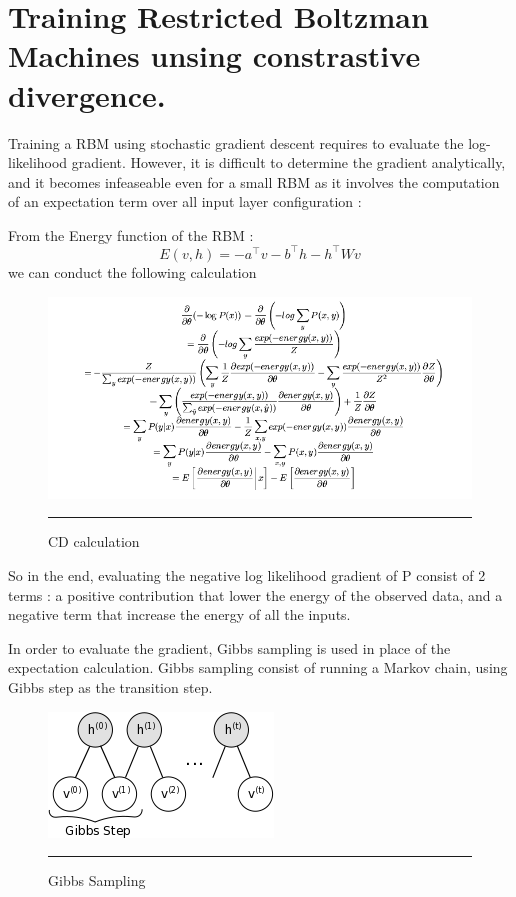 \section{Training Restricted Boltzman Machines unsing constrastive divergence.}


    Training a RBM using stochastic gradient descent requires to evaluate the log-likelihood gradient. However, it is difficult to determine the gradient analytically, and it becomes infeaseable even for a small RBM as it involves the computation of an expectation term over all input layer configuration :

From the Energy function of the RBM :
$$ E(v, h) = -a ^\top v - b^\top h - h^\top W v$$
we can conduct the following calculation 

\begin{figure}[htbp]
    \centering
    \includegraphics[scale=0.6]{Figures/calculation_cd.png}
    \rule{35em}{0.5pt}
    \caption[CD calculaiton]{CD calculation}
    \label{fig:calc_cd}
\end{figure}

So in the end, evaluating the negative log likelihood gradient of P consist of 2 terms : a positive contribution that lower the energy of the observed data, and a negative term that increase the energy of all the inputs.

In order to evaluate the gradient, Gibbs sampling is used in place of the expectation calculation. Gibbs sampling consist of running a Markov chain, using Gibbs step as the transition step. 

\begin{figure}[htbp]
    \centering
    \includegraphics[scale=0.6]{Figures/gibbs_sampling.png}
    \rule{35em}{0.5pt}
    \caption[Gibbs sampling]{Gibbs Sampling}
    \label{fig:gibbs_sampling}
\end{figure}

